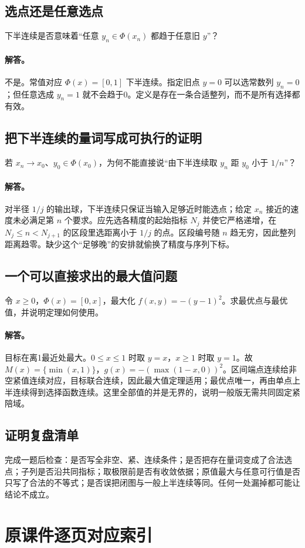 \documentclass[11pt,a4paper]{article}
\theoremstyle{definition}\newtheorem{definition}{定义}\newtheorem{example}{例}
\begin{document}
\subsection{选点还是任意选点}
下半连续是否意味着“任意 $y_n\in\Phi(x_n)$ 都趋于任意旧 $y$”？
\paragraph{解答。}不是。常值对应 $\Phi(x)=[0,1]$ 下半连续。指定旧点 $y=0$ 可以选常数列 $y_n=0$；但任意选成 $y_n=1$ 就不会趋于0。定义是存在一条合适整列，而不是所有选择都有效。
\subsection{把下半连续的量词写成可执行的证明}
若 $x_n\to x_0$、$y_0\in\Phi(x_0)$，为何不能直接说“由下半连续取 $y_n$ 距 $y_0$ 小于 $1/n$”？
\paragraph{解答。}对半径 $1/j$ 的输出球，下半连续只保证当输入足够近时能选点；给定 $x_n$ 接近的速度未必满足第 $n$ 个要求。应先选各精度的起始指标 $N_j$ 并使它严格递增，在 $N_j\le n<N_{j+1}$ 的区段里选距离小于 $1/j$ 的点。区段编号随 $n$ 趋无穷，因此整列距离趋零。缺少这个“足够晚”的安排就偷换了精度与序列下标。
\subsection{一个可以直接求出的最大值问题}
令 $x\ge0$，$\Phi(x)=[0,x]$，最大化 $f(x,y)=-(y-1)^2$。求最优点与最优值，并说明定理如何使用。
\paragraph{解答。}目标在离1最近处最大。$0\le x\le1$ 时取 $y=x$，$x\ge1$ 时取 $y=1$。故 $M(x)=\{\min(x,1)\}$，$g(x)=-(\max(1-x,0))^2$。区间端点连续给非空紧值连续对应，目标联合连续，因此最大值定理适用；最优点唯一，再由单点上半连续得到选择函数连续。这里全部值的并是无界的，说明一般版无需共同固定紧陪域。
\subsection{证明复盘清单}
完成一题后检查：是否写全非空、紧、连续条件；是否把存在量词变成了合法选点；子列是否沿共同指标；取极限前是否有收敛依据；原值最大与任意可行值是否只写了合法的不等式；是否误把闭图与一般上半连续等同。任何一处漏掉都可能让结论不成立。


\clearpage\section{原课件逐页对应索引}
\end{document}
